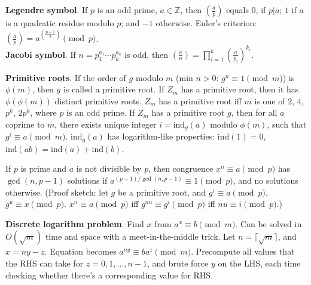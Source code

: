 \documentclass[a4paper, 12pt]{article}
\newcommand{\Topic}[1]{\textbf{#1}}
\begin{document}
\Topic{Legendre symbol}. If $p$ is an odd prime, $a \in {\mathbb Z}$, then
$\left(\frac{a}{p}\right)$ equals $0$, if $p | a$; $1$ if $a$ is a quadratic
residue modulo $p$; and $-1$ otherwise. 
Euler's criterion:
$\left(\frac{a}{p}\right)=a^{\left(\frac{p-1}{2}\right)} \pmod p$. \\
\Topic{Jacobi symbol}.  %
If $n=p_1^{a_1} \cdots p_k^{a_k}$ is odd, then
$\left(\frac{a}{n}\right) = \prod_{i=1}^k \left(\frac{a}{p_i}\right)^{k_i}$.


\Topic{Primitive roots}.  If the order of $g$ modulo $m$ (min $n>0$:
$g^n \equiv 1 \pmod{m}$) is $\phi(m)$, then $g$ is called a primitive root.
If $Z_m$ has a primitive root, then it has $\phi(\phi(m))$ distinct primitive
roots. $Z_m$ has a primitive root iff $m$ is one of $2$, $4$,
$p^k$, $2p^k$, where $p$ is an odd prime.
If $Z_m$ has a primitive root $g$, then for all $a$ coprime to $m$,
there exists unique integer $i=\text{ind}_g(a)$ modulo $\phi(m)$,
such that $g^i \equiv a \pmod{m}$.
$\text{ind}_g(a)$ has logarithm-like properties:
$\text{ind}(1) = 0$, $\text{ind}(ab) = \text{ind}(a) + \text{ind}(b)$.

If $p$ is prime and $a$ is not divisible by $p$, then congruence
$x^n \equiv a \pmod{p}$ has $\gcd(n, p-1)$ solutions if 
$a^{(p-1)/\gcd(n,p-1)} \equiv 1 \pmod{p}$, and no solutions otherwise.
(Proof sketch: let $g$ be a primitive root, and
$g^i \equiv a \pmod{p}$, $g^u \equiv x \pmod{p}$.
$x^n \equiv a \pmod{p}$ iff $g^{nu} \equiv g^i \pmod{p}$ iff $nu \equiv i \pmod{p}$.)

\Topic{Discrete logarithm problem}.  Find $x$ from $a^x \equiv b \pmod{m}$.
Can be solved in $O(\sqrt{m})$ time and space with a meet-in-the-middle trick.
Let $n = \lceil \sqrt{m} \rceil$, and $x = ny - z$.
Equation becomes $a^{ny} \equiv b a^z \pmod{m}$.  Precompute all values that
the RHS can take for $z = 0, 1, \dots, n-1$, and brute force $y$ on the LHS,
each time checking whether there's a corresponding value for RHS.
\end{document}
